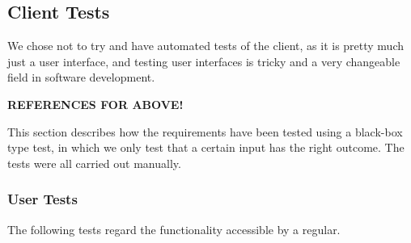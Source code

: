 \subsection{Client Tests}

We
chose not to try and have automated tests of the client, as it is pretty much
just a user interface, and testing user interfaces is tricky and a very
changeable field in software development.

\textbf{REFERENCES FOR ABOVE!}

This section describes how the requirements have been tested using a black-box type test, in which we only test that a certain input has the right outcome. The tests were all carried out manually.

\subsubsection{User Tests}
The following tests regard the functionality accessible by a regular. \\
\centering
\scalebox{0.7}
